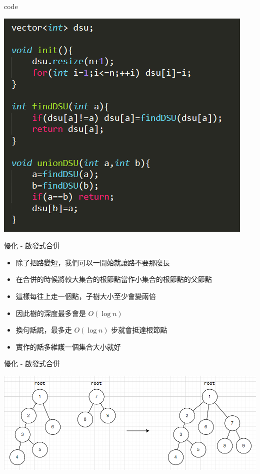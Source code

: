 \documentclass[aspectratio=169]{beamer}
\begin{document}
    \begin{frame}{code}
        \begin{center}
            \includegraphics[scale=0.6]{code/dsu_compression.png}
        \end{center}
    \end{frame}
    \begin{frame}{優化 - 啟發式合併}
        \begin{itemize}
            \item 除了把路變短，我們可以一開始就讓路不要那麼長
            \item<2-> 在合併的時候將較大集合的根節點當作小集合的根節點的父節點
            \item<3-> 這樣每往上走一個點，子樹大小至少會變兩倍
            \item<4-> 因此樹的深度最多會是 $O(\log n)$
            \item<4-> 換句話說，最多走 $O(\log n)$ 步就會抵達根節點
            \item<5-> 實作的話多維護一個集合大小就好
        \end{itemize}
    \end{frame}
    \begin{frame}{優化 - 啟發式合併}
        \begin{center}
            \includegraphics[scale=0.7]{images/DSU_merge.png}
        \end{center}
    \end{frame}
\end{document}
